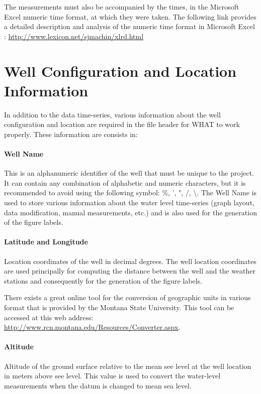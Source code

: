 \documentclass[WHATMANUAL.tex]{subfiles}
\begin{document}
The measurements must also be accompanied by the times, in the Microsoft Excel numeric time format, at which they were taken. The following link provides a detailed description and analysis of the numeric time format in Microsoft Excel : \url{http://www.lexicon.net/sjmachin/xlrd.html}

\section{Well Configuration and Location Information}

In addition to the data time-series, various information about the well configuration and location are required in the file header for WHAT to work properly. These information are consists in:

\paragraph{Well Name} This is an alphanumeric identifier of the well that must be unique to the project. It can contain any combination of alphabetic and numeric characters, but it is recommended to avoid using the following symbol: \%, ', ", /, \textbackslash. The Well Name is used to store various information about the water level time-series (graph layout, data modification, manual measurements, etc.) and is also used for the generation of the figure labels.

\paragraph{Latitude and Longitude} Location coordinates of the well in decimal degrees. The well location coordinates are used principally for computing the distance between the well and the weather stations and consequently for the generation of the figure labels.

There exists a great online tool for the conversion of geographic units in various format that is provided by the Montana State University. This tool can be accessed at this web address: \url{http://www.rcn.montana.edu/Resources/Converter.aspx}.

\paragraph{Altitude} Altitude of the ground surface relative to the mean see level at the well location in meters above see level. This value is used to convert the water-level measurements when the datum is changed to mean sea level.
\end{document}
